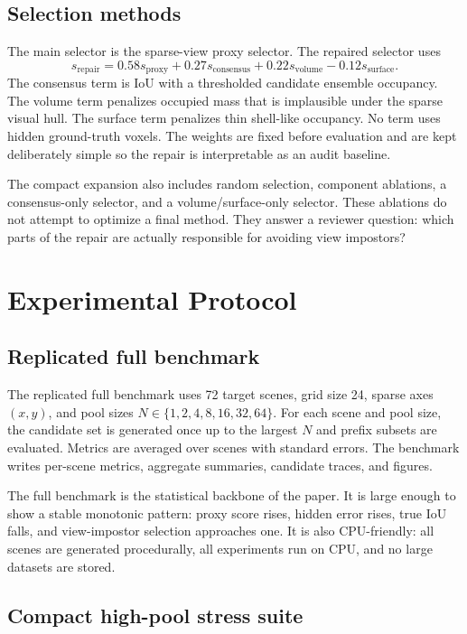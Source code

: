 \documentclass{article}
\begin{document}
\subsection{Selection methods}

The main selector is the sparse-view proxy selector. The repaired selector uses
\[
s_{\mathrm{repair}} = 0.58s_{\mathrm{proxy}}
 + 0.27s_{\mathrm{consensus}}
 + 0.22s_{\mathrm{volume}}
 - 0.12s_{\mathrm{surface}}.
\]
The consensus term is IoU with a thresholded candidate ensemble occupancy.
The volume term penalizes occupied mass that is implausible under the sparse
visual hull. The surface term penalizes thin shell-like occupancy. No term uses
hidden ground-truth voxels. The weights are fixed before evaluation and are
kept deliberately simple so the repair is interpretable as an audit baseline.

The compact expansion also includes random selection, component ablations, a
consensus-only selector, and a volume/surface-only selector. These ablations do
not attempt to optimize a final method. They answer a reviewer question: which
parts of the repair are actually responsible for avoiding view impostors?

\section{Experimental Protocol}

\subsection{Replicated full benchmark}

The replicated full benchmark uses 72 target scenes, grid size 24, sparse axes
$(x,y)$, and pool sizes $N\in\{1,2,4,8,16,32,64\}$. For each scene and pool
size, the candidate set is generated once up to the largest $N$ and prefix
subsets are evaluated. Metrics are averaged over scenes with standard errors.
The benchmark writes per-scene metrics, aggregate summaries, candidate traces,
and figures.

The full benchmark is the statistical backbone of the paper. It is large enough
to show a stable monotonic pattern: proxy score rises, hidden error rises, true
IoU falls, and view-impostor selection approaches one. It is also CPU-friendly:
all scenes are generated procedurally, all experiments run on CPU, and no
large datasets are stored.

\subsection{Compact high-pool stress suite}
\end{document}
